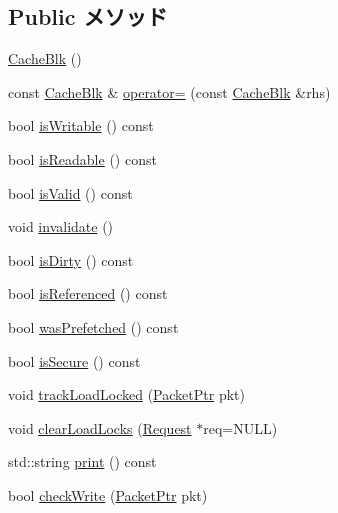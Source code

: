 \subsection*{Public メソッド}
\begin{DoxyCompactItemize}
\item 
\hyperlink{classCacheBlk_a59161d148bebfd16d76645bdb5c0546a}{CacheBlk} ()
\item 
const \hyperlink{classCacheBlk}{CacheBlk} \& \hyperlink{classCacheBlk_a378ee4a2a2e7c3d4035f75e341de89ce}{operator=} (const \hyperlink{classCacheBlk}{CacheBlk} \&rhs)
\item 
bool \hyperlink{classCacheBlk_aa741717fa726eea03300fdde9934808a}{isWritable} () const 
\item 
bool \hyperlink{classCacheBlk_a3d7f091ba732d3899bcb34dde9fbfd63}{isReadable} () const 
\item 
bool \hyperlink{classCacheBlk_aac1b70a2ed67ead038c4d3f5ac4d8a81}{isValid} () const 
\item 
void \hyperlink{classCacheBlk_a893f1101c650c08c98612515c2b1a89c}{invalidate} ()
\item 
bool \hyperlink{classCacheBlk_ad66f409af3c387e166ff7ee95169b7b6}{isDirty} () const 
\item 
bool \hyperlink{classCacheBlk_abeb27e8f22de6b760e272839303a8bfa}{isReferenced} () const 
\item 
bool \hyperlink{classCacheBlk_a2f162efb4889fc082c1d83a4cc0bb222}{wasPrefetched} () const 
\item 
bool \hyperlink{classCacheBlk_a3110ebf17828782ae5aeced7396cfff2}{isSecure} () const 
\item 
void \hyperlink{classCacheBlk_ad317aec11d97a72993e653755fa1c003}{trackLoadLocked} (\hyperlink{classPacket}{PacketPtr} pkt)
\item 
void \hyperlink{classCacheBlk_a9e0b822a716ddb1833f6be383be068e7}{clearLoadLocks} (\hyperlink{classRequest}{Request} $\ast$req=NULL)
\item 
std::string \hyperlink{classCacheBlk_ae8a5b5e9e0e6be3b115ee77fa7b4d0c8}{print} () const 
\item 
bool \hyperlink{classCacheBlk_a52fb137178c5b2a791f2382796c17840}{checkWrite} (\hyperlink{classPacket}{PacketPtr} pkt)
\end{DoxyCompactItemize}

